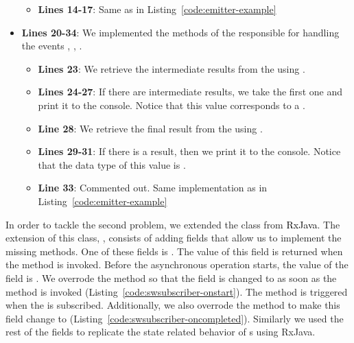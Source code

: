 \documentclass[type=bsc,accentcolor=tud9c]{tudthesis}
\newcommand{\framework}[1]{\textcolor{black}{#1}}
\begin{document}
\begin{itemize}
\begin{itemize}
		\item {\bfseries Lines 14-17}: Same as in Listing~\ref{code:emitter-example}
		\end{itemize}
	\item {\bfseries Lines 20-34}: We implemented the methods of the  responsible for handling the events , , .
		\begin{itemize}
			\item {\bfseries Lines 23}: We retrieve the intermediate results from the  using .
			\item {\bfseries Lines 24-27}: If there are intermediate results, we take the first one and print it to the console. Notice that this value corresponds to a .
			\item {\bfseries Line 28}: We retrieve the final result from the  using .
			\item {\bfseries Lines 29-31}: If there is a result, then we print it to the console. Notice that the data type of this value is .
			\item {\bfseries Line 33}: Commented out. Same implementation as in Listing~\ref{code:emitter-example}
		\end{itemize}
\end{itemize}





In order to tackle the second problem, we extended the class  from \framework{RxJava}. The extension of this class, , consists of adding fields that allow us to implement the missing methods. One of these fields is . The value of this field is returned when the method  is invoked. Before the asynchronous operation starts, the value of the field is . We overrode the method  so that the field  is changed to  as soon as the method is invoked (Listing~\ref{code:swsubscriber-onstart}). The method  is triggered when the  is subscribed. Additionally, we also overrode the method  to make this field change to  (Listing~\ref{code:swsubscriber-oncompleted}). Similarly we used the rest of the fields to replicate the state related behavior of s using RxJava.
\end{document}
